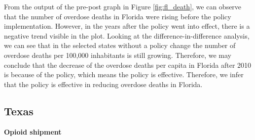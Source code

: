 \documentclass[12pt,letterpaper]{article}
\begin{document}
From the output of the pre-post graph in Figure \ref{fig:fl_death}, we can observe that the number of overdose deaths in Florida were rising before the policy implementation. However, in the years after the policy went into effect, there is a negative trend visible in the plot. Looking at the difference-in-difference analysis, we can see that in the selected states without a policy change the number of overdose deaths per 100,000 inhabitants is still growing.  Therefore, we may conclude that the decrease of the overdose deaths per capita in Florida after 2010 is because of the policy, which means the policy is effective. Therefore, we infer that the policy is effective in reducing overdose deaths in Florida.

\subsection{Texas}
\textbf{Opioid shipment}
\end{document}
